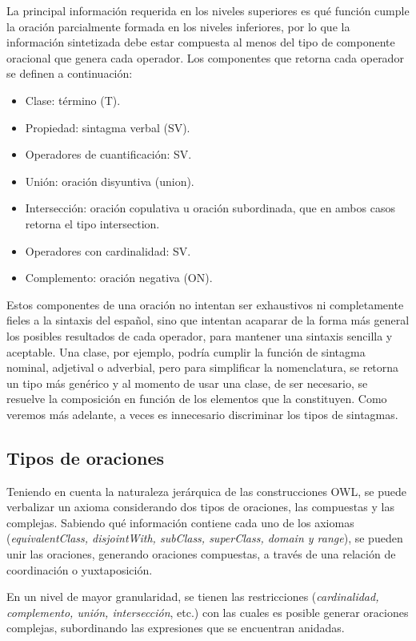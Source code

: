 La principal información requerida en los niveles superiores es qué función cumple la oración parcialmente formada en los niveles inferiores, por lo que la información sintetizada debe estar compuesta al menos del tipo de componente oracional que genera cada operador. Los componentes que retorna cada operador se definen a continuación:
\begin{itemize}
    \item Clase: término (T).
    \item Propiedad: sintagma verbal (SV).
    \item Operadores de cuantificación: SV.
    \item Unión: oración disyuntiva (union).
    \item Intersección: oración copulativa u oración subordinada, que en ambos casos retorna el tipo intersection.%
    \item Operadores con cardinalidad: SV.
    \item Complemento: oración negativa (ON).
\end{itemize}

Estos componentes de una oración no intentan ser exhaustivos ni completamente fieles a la sintaxis del español, sino que intentan acaparar de la forma más general los posibles resultados de cada operador, para mantener una sintaxis sencilla y aceptable. Una clase, por ejemplo, podría cumplir la función de sintagma nominal, adjetival o adverbial, pero para simplificar la nomenclatura, se retorna un tipo más genérico y al momento de usar una clase, de ser necesario, se resuelve la composición en función de los elementos que la constituyen. Como veremos más adelante, a veces es innecesario discriminar los tipos de sintagmas.

\subsection{Tipos de oraciones}
Teniendo en cuenta la naturaleza jerárquica de las construcciones OWL, se puede verbalizar un axioma considerando dos tipos de oraciones, las compuestas y las complejas. Sabiendo qué información contiene cada uno de los axiomas (\emph{equivalentClass, disjointWith, subClass, superClass, domain y range}), se pueden unir las oraciones, generando oraciones compuestas, a través de una relación de coordinación o yuxtaposición.

En un nivel de mayor granularidad, se tienen las restricciones (\emph{cardinalidad, complemento, unión, intersección}, etc.) con las cuales es posible generar oraciones complejas, subordinando las expresiones que se encuentran anidadas.

